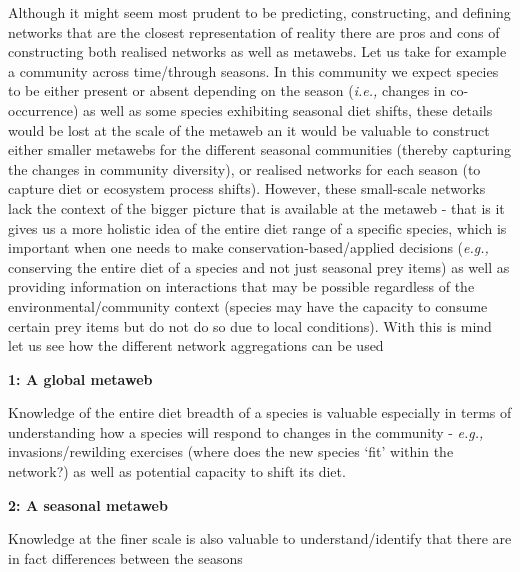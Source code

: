 \documentclass[
]{article}
\begin{document}
\begin{tcolorbox}[enhanced jigsaw, toprule=.15mm, toptitle=1mm, opacitybacktitle=0.6, opacityback=0, arc=.35mm, colframe=quarto-callout-note-color-frame, rightrule=.15mm, coltitle=black, colbacktitle=quarto-callout-note-color!10!white, bottomrule=.15mm, breakable, bottomtitle=1mm, title=\textcolor{quarto-callout-note-color}{\faInfo}\hspace{0.5em}{Box 1 - Why we need to aggregate networks at different scales: A
hypothetical case study}, titlerule=0mm, left=2mm, leftrule=.75mm, colback=white]

Although it might seem most prudent to be predicting, constructing, and
defining networks that are the closest representation of reality there
are pros and cons of constructing both realised networks as well as
metawebs. Let us take for example a community across time/through
seasons. In this community we expect species to be either present or
absent depending on the season (\emph{i.e.,} changes in co-occurrence)
as well as some species exhibiting seasonal diet shifts, these details
would be lost at the scale of the metaweb an it would be valuable to
construct either smaller metawebs for the different seasonal communities
(thereby capturing the changes in community diversity), or realised
networks for each season (to capture diet or ecosystem process shifts).
However, these small-scale networks lack the context of the bigger
picture that is available at the metaweb - that is it gives us a more
holistic idea of the entire diet range of a specific species, which is
important when one needs to make conservation-based/applied decisions
(\emph{e.g.,} conserving the entire diet of a species and not just
seasonal prey items) as well as providing information on interactions
that may be possible regardless of the environmental/community context
(species may have the capacity to consume certain prey items but do not
do so due to local conditions). With this is mind let us see how the
different network aggregations can be used

\textbf{1: A global metaweb}

Knowledge of the entire diet breadth of a species is valuable especially
in terms of understanding how a species will respond to changes in the
community - \emph{e.g.,} invasions/rewilding exercises (where does the
new species `fit' within the network?) as well as potential capacity to
shift its diet.

\textbf{2: A seasonal metaweb}

Knowledge at the finer scale is also valuable to understand/identify
that there are in fact differences between the seasons


\end{tcolorbox}
\end{document}
